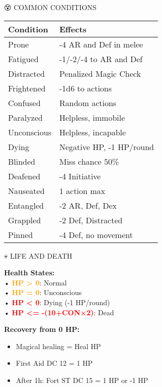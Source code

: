 \documentclass[10pt,a4paper,landscape]{article}
\newcommand{\highlight}[1]{\textcolor{orange}{\textbf{#1}}}
\newcommand{\critical}[1]{\textcolor{red}{\textbf{#1}}}
\begin{document}
\begin{multicols}{4}
		\begin{mainsection}{😵 COMMON CONDITIONS}
			\begin{tabular}{@{}p{2.2cm}p{3.4cm}@{}}
				\toprule
				\textbf{Condition} & \textbf{Effects} \\
				\midrule
				Prone & -4 AR and Def in melee \\
				Fatigued & -1/-2/-4 to AR and Def \\
				Distracted & Penalized Magic Check \\
				Frightened & -1d6 to actions \\
				Confused & Random actions \\
				Paralyzed & Helpless, immobile \\
				Unconscious & Helpless, incapable \\
				Dying & Negative HP, -1 HP/round \\
				Blinded & Miss chance 50\% \\
				Deafened & -4 Initiative \\
				Nauseated & 1 action max \\
				Entangled & -2 AR, Def, Dex \\
				Grappled & -2 Def, Distracted \\
				Pinned & -4 Def, no movement \\
				\bottomrule
			\end{tabular}
		\end{mainsection}
		
		\begin{mainsection}{💀 LIFE AND DEATH}
			\begin{formula}
				\textbf{Health States:}\\
				• \highlight{HP > 0}: Normal\\
				• \highlight{HP = 0}: Unconscious\\
				• \critical{HP < 0}: Dying (-1 HP/round)\\
				• \critical{HP <= -(10+CON×2)}: Dead
			\end{formula}
			
			\textbf{Recovery from 0 HP:}
			\begin{itemize}[noitemsep,leftmargin=8pt]
				\item Magical healing = Heal HP
				\item First Aid DC 12 = 1 HP
				\item After 1h: Fort ST DC 15 = 1 HP or -1 HP
			\end{itemize}
			

\end{mainsection}
\end{multicols}
\end{document}
